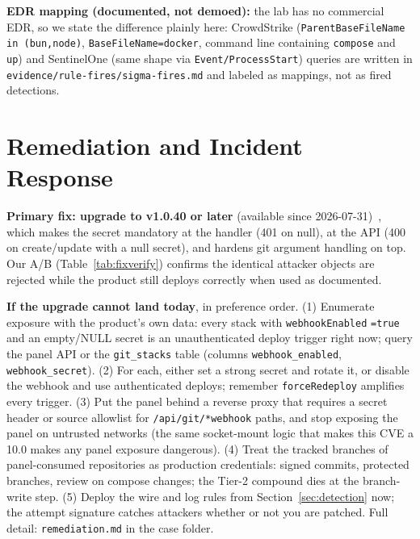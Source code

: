 \documentclass[journal]{IEEEtran}
\begin{document}
\textbf{EDR mapping (documented, not demoed):} the lab has no commercial EDR,
so we state the difference plainly here: CrowdStrike (\texttt{ParentBaseFileName}
\texttt{in (bun,node)}, \texttt{BaseFileName=docker}, command line containing
\texttt{compose} and \texttt{up}) and SentinelOne (same shape via
\texttt{Event/ProcessStart}) queries are written in
\texttt{evidence/rule-fires/}\allowbreak\texttt{sigma-fires.md} and labeled
as mappings, not as fired detections.

\section{Remediation and Incident Response}
\label{sec:remediation}

\textbf{Primary fix: upgrade to v1.0.40 or later} (available since
2026-07-31)~\cite{vendorfix}, which makes the secret mandatory at the handler
(401 on null), at the API (400 on create/update with a null secret), and
hardens git argument handling on top. Our A/B (Table~\ref{tab:fixverify})
confirms the identical attacker objects are rejected while the product still
deploys correctly when used as documented.

\textbf{If the upgrade cannot land today}, in preference order. (1) Enumerate
exposure with the product's own data: every stack with \texttt{webhookEnabled}
\texttt{=true} and an empty/NULL secret is an unauthenticated deploy trigger
right now; query the panel API or the \texttt{git\_stacks} table (columns
\texttt{webhook\_enabled}, \texttt{webhook\_secret}). (2) For each, either set
a strong secret and rotate it, or disable the webhook and use authenticated
deploys; remember \texttt{forceRedeploy} amplifies every trigger. (3) Put the
panel behind a reverse proxy that requires a secret header or source allowlist
for \texttt{/api/git/}\texttt{*webhook} paths, and stop exposing the panel on
untrusted networks (the same socket-mount logic that makes this CVE a 10.0
makes any panel exposure dangerous). (4) Treat the tracked branches of
panel-consumed repositories as production credentials: signed commits,
protected branches, review on compose changes; the Tier-2 compound dies at the
branch-write step. (5) Deploy the wire and log rules from
Section~\ref{sec:detection} now; the attempt signature catches attackers
whether or not you are patched. Full detail: \texttt{remediation.md} in the
case folder.
\end{document}
